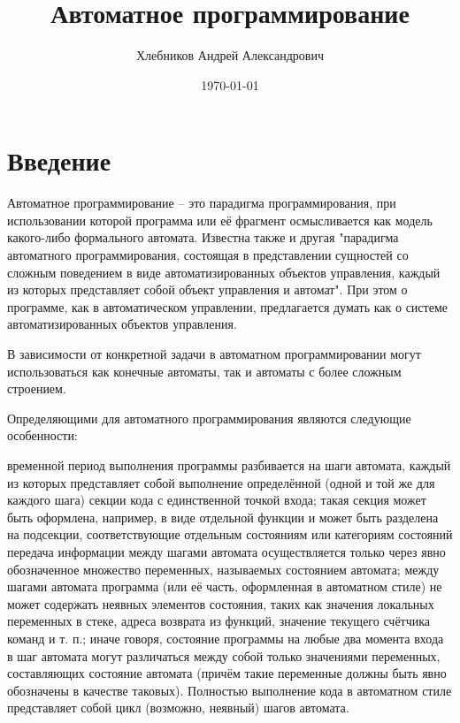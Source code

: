 \documentclass[12pt, twoside]{report}
\begin{document}
\pagestyle{empty}
\title{\textbf{Автоматное программирование}}
\author{Хлебников Андрей Александрович}
\date{\today}

\maketitle
\pagestyle{empty}
\newpage
\renewcommand{\cftchapdotsep}{\cftdotsep}
\tableofcontents
\newpage
\pagestyle{fancy}
\fancyhf{}
\lhead[]{\thepage}
\rhead[\thepage]{}

\singlespacing

\chapter*{Введение}

Автоматное программирование -- это парадигма программирования, при использовании которой программа или её фрагмент осмысливается как модель какого-либо формального автомата. Известна также и другая "парадигма автоматного программирования, состоящая в представлении сущностей со сложным поведением в виде автоматизированных объектов управления, каждый из которых представляет собой объект управления и автомат". При этом о программе, как в автоматическом управлении, предлагается думать как о системе автоматизированных объектов управления.

В зависимости от конкретной задачи в автоматном программировании могут использоваться как конечные автоматы, так и автоматы с более сложным строением.

Определяющими для автоматного программирования являются следующие особенности:

временной период выполнения программы разбивается на шаги автомата, каждый из которых представляет собой выполнение определённой (одной и той же для каждого шага) секции кода с единственной точкой входа; такая секция может быть оформлена, например, в виде отдельной функции и может быть разделена на подсекции, соответствующие отдельным состояниям или категориям состояний
передача информации между шагами автомата осуществляется только через явно обозначенное множество переменных, называемых состоянием автомата; между шагами автомата программа (или её часть, оформленная в автоматном стиле) не может содержать неявных элементов состояния, таких как значения локальных переменных в стеке, адреса возврата из функций, значение текущего счётчика команд и т. п.; иначе говоря, состояние программы на любые два момента входа в шаг автомата могут различаться между собой только значениями переменных, составляющих состояние автомата (причём такие переменные должны быть явно обозначены в качестве таковых).
Полностью выполнение кода в автоматном стиле представляет собой цикл (возможно, неявный) шагов автомата.
\end{document}

